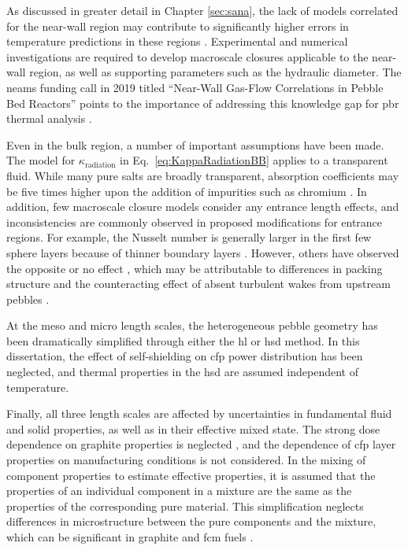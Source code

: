 As discussed in greater detail in Chapter \ref{sec:sana}, the lack of models correlated for the near-wall region may contribute to significantly higher errors in temperature predictions in these regions \cite{novak_2019}. Experimental and numerical investigations are required to develop macroscale closures applicable to the near-wall region, as well as supporting parameters such as the hydraulic diameter. The \gls{neams} funding call in 2019 titled ``Near-Wall Gas-Flow Correlations in Pebble Bed Reactors'' points to the importance of addressing this knowledge gap for \gls{pbr} thermal analysis \cite{neams2}. 

Even in the bulk region, a number of important assumptions have been made. The model for \(\kappa_\text{radiation}\) in Eq.\ \eqref{eq:KappaRadiationBB} applies to a transparent fluid. While many pure salts are broadly transparent, absorption coefficients may be five times higher upon the addition of impurities such as chromium \cite{chaleff}. In addition, few macroscale closure models consider any entrance length effects, and inconsistencies are commonly observed in proposed modifications for entrance regions. For example, the Nusselt number is generally larger in the first few sphere layers because of thinner boundary layers \cite{ferng,song}. However, others have observed the opposite \cite{KTAhtc} or no effect \cite{song}, which may be attributable to differences in packing structure and the counteracting effect of absent turbulent wakes from upstream pebbles \cite{achenbach}. 

At the meso and micro length scales, the heterogeneous pebble geometry has been dramatically simplified through either the \gls{hl} or \gls{hsd} method. In this dissertation, the effect of self-shielding on \gls{cfp} power distribution has been neglected, and thermal properties in the \gls{hsd} are assumed independent of temperature. 

Finally, all three length scales are affected by uncertainties in fundamental fluid and solid properties, as well as in their effective mixed state. The strong dose dependence on graphite properties is neglected \cite{seker}, and the dependence of \gls{cfp} layer properties on manufacturing conditions is not considered. In the mixing of component properties to estimate effective properties, it is assumed that the properties of an individual component in a mixture are the same as the properties of the corresponding pure material. This simplification neglects differences in microstructure between the pure components and the mixture, which can be significant in graphite and \gls{fcm} fuels \cite{folsom,lee2017}.



